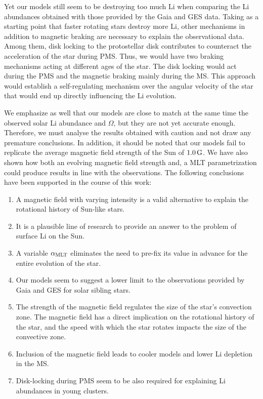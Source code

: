 \documentclass[fleqn,usenatbib]{mnras}
\begin{document}
\begin{ceqn}
Yet our models still seem to be destroying too much Li when comparing the Li abundances obtained with those provided by the Gaia and GES data. Taking as a starting point that faster rotating stars destroy more Li, other mechanisms in addition to magnetic braking are necessary to explain the observational data. Among them, disk locking to the protostellar disk contributes to counteract the acceleration of the star during PMS. Thus, we would have two braking mechanisms acting at different ages of the star. The disk locking would act during the PMS and the magnetic braking mainly during the MS. This approach would establish a self-regulating mechanism over the angular velocity of the star that would end up directly influencing the Li evolution.\par

We emphasize as well that our models are close to match at the same time the observed solar Li abundance and $\Omega$, but they are not yet accurate enough. Therefore, we must analyse the results obtained with caution and not draw any premature conclusions. In addition, it should be noted that our models fail to replicate the average magnetic field strength of the Sun of $1.0\,\mathrm{G}$. We have also shown how both an evolving magnetic field strength and, a MLT parametrization could produce results in line with the observations. The following conclusions have been supported in the course of this work:

\begin{enumerate}
    \item A magnetic field with varying intensity is a valid alternative to explain the rotational history of Sun-like stars.
    \item It is a plausible line of research to provide an answer to the problem of surface Li on the Sun.
    \item A variable $\alpha_{\mathrm{MLT}}$ eliminates the need to pre-fix its value in advance for the entire evolution of the star.
    \item Our models seem to suggest a lower limit to the observations provided by Gaia and GES for solar sibling stars.
    \item The strength of the magnetic field regulates the size of the star's convection zone. The magnetic field has a direct implication on the rotational history of the star, and the speed with which the star rotates impacts the size of the convective zone.     
    \item Inclusion of the magnetic field leads to cooler models and lower Li depletion in the MS.
    \item Disk-locking during PMS seem to be also required for explaining Li abundances in young clusters.
\end{enumerate}
\par


\end{ceqn}
\end{document}
